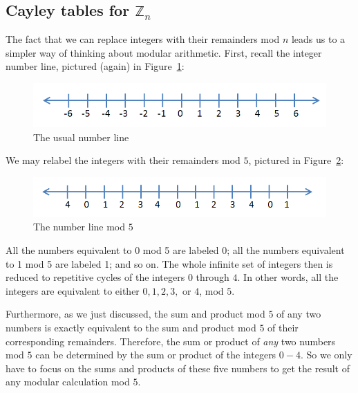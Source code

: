 \subsection{Cayley tables for ${\mathbb Z}_n$}\label{sec:cayleyForZn1}
The fact that we can replace integers with their remainders mod $n$ leads us to a simpler way of  thinking about modular arithmetic.  First, recall the integer number line, pictured (again) in Figure~\ref{fig:integers}:
\begin{figure}[h]
\begin{center}
\includegraphics[width=4.5in]{images/integer_line.png}
\end{center}
\caption{The usual number line\label{fig:integers}}
\end{figure}
We may relabel the integers with their remainders mod $5$, pictured in Figure~\ref{fig:integers_mod_5}:
\begin{figure}[h]
\begin{center}
\includegraphics[width=4.5in]{images/integers_mod_5.png}
\end{center}
\caption{The number line mod $5$ \label{fig:integers_mod_5}}
\end{figure}
All the numbers equivalent to 0 mod 5 are labeled 0; all the numbers equivalent to 1 mod 5 are labeled 1; and so on.  The whole infinite set of integers then is reduced to repetitive cycles of the integers $0$ through $4$.  In other words, all the integers are equivalent to either $0, 1, 2, 3,$ or $4$, mod $5$.  

Furthermore, as we just discussed, the sum and product mod $5$ of any two numbers is exactly equivalent to the sum and product mod $5$ of their corresponding remainders.  Therefore, the sum or product of \emph{any} two numbers mod $5$ can be determined by the sum or product of the integers $0-4$.  So we only have to focus on the sums and products of these five numbers to get the result of any modular calculation mod $5$.  

